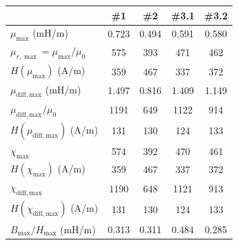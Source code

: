 \begin{tabular}{lcccc}
\toprule
& \textlatin{\#}1 & \textlatin{\#}2 & \textlatin{\#}3.1 & \textlatin{\#}3.2 \\
\midrule
$\mu_{\max}$ (\textlatin{mH/m}) & 0.723 & 0.494 & 0.591 & 0.580 \\
$\mu_{r,\max}=\mu_{\max}/\mu_0$ & 575 & 393 & 471 & 462 \\
$H(\mu_{\max})$ (\textlatin{A/m}) & 359 & 467 & 337 & 372 \\
$\mu_{\mathrm{diff,max}}$ (\textlatin{mH/m}) & 1.497 & 0.816 & 1.409 & 1.149 \\
$\mu_{\mathrm{diff,max}}/\mu_0$ & 1191 & 649 & 1122 & 914 \\
$H(\mu_{\mathrm{diff,max}})$ (\textlatin{A/m}) & 131 & 130 & 124 & 133 \\
$\chi_{\max}$ & 574 & 392 & 470 & 461 \\
$H(\chi_{\max})$ (\textlatin{A/m}) & 359 & 467 & 337 & 372 \\
$\chi_{\mathrm{diff,max}}$ & 1190 & 648 & 1121 & 913 \\
$H(\chi_{\mathrm{diff,max}})$ (\textlatin{A/m}) & 131 & 130 & 124 & 133 \\
$B_{\max}/H_{\max}$ (\textlatin{mH/m}) & 0.313 & 0.311 & 0.484 & 0.285 \\
\bottomrule
\end{tabular}
